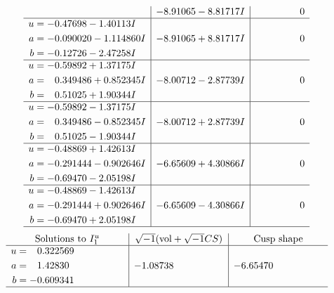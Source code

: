 \documentclass[1p]{elsarticle_modified}
\theoremstyle{definition}
\newcommand{\I}{\sqrt{-1}}
\begin{document}
$$\begin{array}{c|c|c}
 & -8.91065 - 8.81717 I & \phantom{-0.000000 } 0 \\ \hline\begin{aligned}
u &= -0.47698 - 1.40113 I \\
a &= -0.090020 - 1.114860 I \\
b &= -0.12726 - 2.47258 I\end{aligned}
 & -8.91065 + 8.81717 I & \phantom{-0.000000 } 0 \\ \hline\begin{aligned}
u &= -0.59892 + 1.37175 I \\
a &= \phantom{-}0.349486 + 0.852345 I \\
b &= \phantom{-}0.51025 + 1.90344 I\end{aligned}
 & -8.00712 - 2.87739 I & \phantom{-0.000000 } 0 \\ \hline\begin{aligned}
u &= -0.59892 - 1.37175 I \\
a &= \phantom{-}0.349486 - 0.852345 I \\
b &= \phantom{-}0.51025 - 1.90344 I\end{aligned}
 & -8.00712 + 2.87739 I & \phantom{-0.000000 } 0 \\ \hline\begin{aligned}
u &= -0.48869 + 1.42613 I \\
a &= -0.291444 - 0.902646 I \\
b &= -0.69470 - 2.05198 I\end{aligned}
 & -6.65609 + 4.30866 I & \phantom{-0.000000 } 0 \\ \hline\begin{aligned}
u &= -0.48869 - 1.42613 I \\
a &= -0.291444 + 0.902646 I \\
b &= -0.69470 + 2.05198 I\end{aligned}
 & -6.65609 - 4.30866 I & \phantom{-0.000000 } 0\\
 \hline 
 \end{array}$$\newpage$$\begin{array}{c|c|c}  
\text{Solutions to }I^u_{1}& \I (\text{vol} + \sqrt{-1}CS) & \text{Cusp shape}\\
 \hline 
\begin{aligned}
u &= \phantom{-}0.322569\phantom{ +0.000000I} \\
a &= \phantom{-}1.42830\phantom{ +0.000000I} \\
b &= -0.609341\phantom{ +0.000000I}\end{aligned}
 & -1.08738\phantom{ +0.000000I} & -6.65470\phantom{ +0.000000I}\\
 \hline 
 \end{array}$$\newpage\newpage\renewcommand{\arraystretch}{1}
\end{document}

